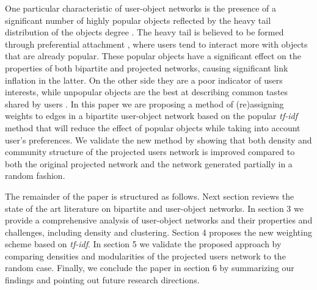 One particular characteristic of user-object networks is the presence of a
significant number of highly popular objects reflected by the heavy tail
distribution of the objects degree \citep{shang10empirical}. The heavy tail is
believed to be formed through preferential attachment
\citep{barabasi2002evolution}, where users tend to interact more with objects
that are already popular. These popular objects have a significant effect on the
properties of both bipartite and projected networks, causing significant link
inflation in the latter. On the other side they are a poor indicator of users
interests, while unpopular objects are the best at describing common tastes
shared by users \citep{shang10empirical}. In this paper we are proposing a
method of (re)assigning weights to edges in a bipartite user-object network
based on the popular \emph{tf-idf} method that will reduce the effect of popular
objects while taking into account user's preferences. We validate the new method
by showing that both density and community structure of the projected users
network is improved compared to both the original projected network and the
network generated partially in a random fashion.

The remainder of the paper is structured as follows. Next section reviews the
state of the art literature on bipartite and user-object networks. In section 3
we provide a comprehensive analysis of user-object networks and their properties
and challenges, including density and clustering. Section 4 proposes the new
weighting scheme based on \emph{tf-idf}. In section 5 we validate the proposed
approach by comparing densities and modularities of the projected users network
to the random case. Finally, we conclude the paper in section 6 by summarizing
our findings and pointing out future research directions.
